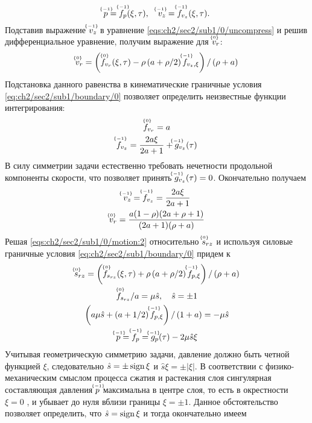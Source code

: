 \begin{equation*}
  \uindex{p}{-1} = \uindex{f}{-1}_{p}(\xi, \tau), \quad \uindex{v}{-1}_{z} = \uindex{f}{-1}_{v_{z}}(\xi, \tau).
\end{equation*}
Подставив выражение $\uindex{v}{-1}_{z}$ в уравнение \cref{eqs:ch2/sec2/sub1/0/uncompress} и решив дифференциальное уравнение, получим выражение для $\uindex{v}{0}_{r}$:
\begin{equation*}
  \uindex{v}{0}_{r} = \left(\uindex{f}{0}_{v_{r}}(\xi, \tau) -\rho \left(a+\rho/2\right) \uindex{f}{-1}_{v_{z},\xi}\right) / \left(\rho+a\right)
\end{equation*}
Подстановка данного равенства в кинематические граничные условия \cref{eq:ch2/sec2/sub1/boundary/0} позволяет определить неизвестные функции интегрирования:
\begin{gather*}
  \uindex{f}{0}_{v_{r}} = a\\
  \uindex{f}{-1}_{v_{z}} = \frac{2a\xi}{2a+1} + \uindex{g}{-1}_{v_{z}}(\tau)
\end{gather*}
В силу симметрии задачи естественно требовать нечетности продольной компоненты скорости, что позволяет принять $\uindex{g}{-1}_{v_{z}}(\tau) = 0$. Окончательно получаем
\begin{gather}
  \label{sol:ch2/sec2/sub1/vz/-1}
  \uindex{v}{-1}_{z} = \uindex{f}{-1}_{v_{z}} = \frac{2a\xi}{2a+1}
  \\
  \label{sol:ch2/sec2/sub1/vr/0}
  \uindex{v}{0}_{r} =  \frac{a(1-\rho)(2a+\rho+1)}{(2a+1)(\rho+a)}
\end{gather}
Решая \cref{eqs:ch2/sec2/sub1/0/motion:2} относительно $\uindex{s}{0}_{rz}$ и используя силовые граничные условия \cref{eq:ch2/sec2/sub1/boundary/0} придем к
\begin{gather*}
  \uindex{s}{0}_{rz} = \left(\uindex{f}{0}_{s_{rz}}(\xi, \tau) + \rho \left(a+\rho/2\right) \uindex{f}{-1}_{p,\xi}\right) / \left(\rho+a\right)
  \\
  \uindex{f}{0}_{s_{rz}} / a = \mu\hat{s}, \quad \hat{s} = \pm 1
  \\
  \left(a \mu\hat{s} + \left(a+1/2\right) \uindex{f}{-1}_{p,\xi}\right) / \left(1+a\right) = -\mu \hat{s}
  \\
  \uindex{p}{-1}=\uindex{f}{-1}_{p} =\uindex{g}{-1}_{p}(\tau) -2\mu\hat{s}\xi
\end{gather*}
Учитывая геометрическую симметрию задачи, давление должно быть четной функцией $\xi$, следовательно $\hat{s} = \pm\sign\xi$ и $\hat{s}\xi = \pm\lvert\xi\rvert$. В соответствии с физико-механическим смыслом процесса сжатия и растекания слоя сингулярная составляющая давления $\uindex{p}{-1}$ максимальна в центре слоя, то есть в окрестности $\xi = 0$ , и убывает до нуля вблизи границы $\xi=\pm1$. Данное обстоятельство позволяет определить, что $\hat{s} = \sign\xi$ и тогда окончательно имеем

